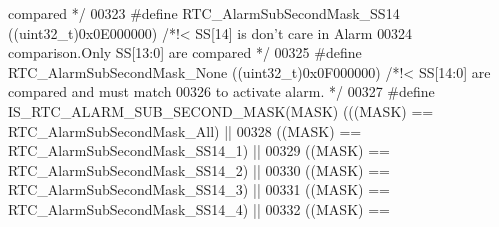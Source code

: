 \begin{DoxyCode}
{       compared */}
00323 \textcolor{preprocessor}{#}\textcolor{preprocessor}{define} \textcolor{preprocessor}{RTC\_AlarmSubSecondMask\_SS14}        \textcolor{preprocessor}{(}\textcolor{preprocessor}{(}\textcolor{preprocessor}{uint32\_t}\textcolor{preprocessor}{)}0x0E000000\textcolor{preprocessor}{)} \textcolor{comment}{/*!< SS[14] is don't care in Alarm }
00324 \textcolor{comment}{                                                                       comparison.Only SS[13:0] are
       compared */}
00325 \textcolor{preprocessor}{#}\textcolor{preprocessor}{define} \textcolor{preprocessor}{RTC\_AlarmSubSecondMask\_None}        \textcolor{preprocessor}{(}\textcolor{preprocessor}{(}\textcolor{preprocessor}{uint32\_t}\textcolor{preprocessor}{)}0x0F000000\textcolor{preprocessor}{)} \textcolor{comment}{/*!< SS[14:0] are compared and must
       match }
00326 \textcolor{comment}{                                                                       to activate alarm. */}
00327 \textcolor{preprocessor}{#}\textcolor{preprocessor}{define} \textcolor{preprocessor}{IS\_RTC\_ALARM\_SUB\_SECOND\_MASK}\textcolor{preprocessor}{(}\textcolor{preprocessor}{MASK}\textcolor{preprocessor}{)}   \textcolor{preprocessor}{(}\textcolor{preprocessor}{(}\textcolor{preprocessor}{(}\textcolor{preprocessor}{MASK}\textcolor{preprocessor}{)} \textcolor{preprocessor}{==} 
      RTC_AlarmSubSecondMask_All\textcolor{preprocessor}{)} \textcolor{preprocessor}{||}
00328                                               \textcolor{preprocessor}{(}\textcolor{preprocessor}{(}\textcolor{preprocessor}{MASK}\textcolor{preprocessor}{)} \textcolor{preprocessor}{==} 
      RTC_AlarmSubSecondMask_SS14_1\textcolor{preprocessor}{)} \textcolor{preprocessor}{||}
00329                                               \textcolor{preprocessor}{(}\textcolor{preprocessor}{(}\textcolor{preprocessor}{MASK}\textcolor{preprocessor}{)} \textcolor{preprocessor}{==} 
      RTC_AlarmSubSecondMask_SS14_2\textcolor{preprocessor}{)} \textcolor{preprocessor}{||}
00330                                               \textcolor{preprocessor}{(}\textcolor{preprocessor}{(}\textcolor{preprocessor}{MASK}\textcolor{preprocessor}{)} \textcolor{preprocessor}{==} 
      RTC_AlarmSubSecondMask_SS14_3\textcolor{preprocessor}{)} \textcolor{preprocessor}{||}
00331                                               \textcolor{preprocessor}{(}\textcolor{preprocessor}{(}\textcolor{preprocessor}{MASK}\textcolor{preprocessor}{)} \textcolor{preprocessor}{==} 
      RTC_AlarmSubSecondMask_SS14_4\textcolor{preprocessor}{)} \textcolor{preprocessor}{||}
00332                                               \textcolor{preprocessor}{(}\textcolor{preprocessor}{(}\textcolor{preprocessor}{MASK}\textcolor{preprocessor}{)} \textcolor{preprocessor}{==} 

\end{DoxyCode}
